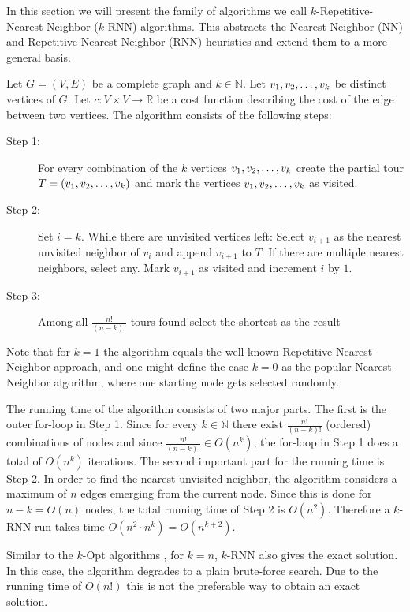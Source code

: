 In this section we will present the family of algorithms we call $k$-Repetitive-Nearest-Neighbor ($k$-RNN) algorithms. 
This abstracts the Nearest-Neighbor (NN) and Repetitive-Nearest-Neighbor (RNN) heuristics and extend them to a more general basis.

Let $G = (V, E)$ be a complete graph and $k \in \mathbb{N}$. Let $v_1, v_2, \mathellipsis, v_k$ be distinct vertices of $G$. 
Let $c: V \times V \rightarrow \mathbb{R}$ be a cost function describing the cost of the edge between two vertices. 
The algorithm consists of the following steps:


\begin{description}
	\item[Step 1:] For every combination of the $k$ vertices $v_1, v_2, \mathellipsis, v_k$ create the partial tour $T = (v_1, v_2, \mathellipsis, v_k)$ and mark the vertices $v_1, v_2, \mathellipsis, v_k$ as visited.
	
	\item[Step 2:] Set $i = k$. While there are unvisited vertices left: 
	Select $v_{i+1}$ as the nearest unvisited neighbor of $v_i$ and append $v_{i+1}$ to $T$. 
	If there are multiple nearest neighbors, select any.
	Mark $v_{i+1}$ as visited and increment $i$ by $1$.
	
	\item[Step 3:] Among all $\frac{n!}{(n-k)!}$ tours found select the shortest as the result
\end{description}	

Note that for $k = 1$ the algorithm equals the well-known Repetitive-Nearest-Neighbor approach, and one might define the case $k = 0$ as the popular Nearest-Neighbor algorithm, where one starting node gets selected randomly.

The running time of the algorithm consists of two major parts. 
The first is the outer for-loop in Step 1. 
Since for every $k \in \mathbb{N}$ there exist $\frac{n!}{(n-k)!}$ (ordered) combinations of nodes and since $\frac{n!}{(n-k)!} \in O(n^k)$, the for-loop in Step 1 does a total of $O(n^k)$ iterations.
The second important part for the running time is Step 2. In order to find the nearest unvisited neighbor, the algorithm considers a maximum of $n$ edges emerging from the current node. 
Since this is done for $n - k = O(n)$ nodes, the total running time of Step 2 is $O(n^2)$.
Therefore a $k$-RNN run takes time $O(n^2 \cdot n^k) = O(n^{k+2})$.

Similar to the $k$-Opt algorithms \cite{CROES1958, LIN1973}, for $k = n$, $k$-RNN also gives the exact solution. In this case, the algorithm degrades to a plain brute-force search.
Due to the running time of $O(n!)$ this is not the preferable way to obtain an exact solution.

